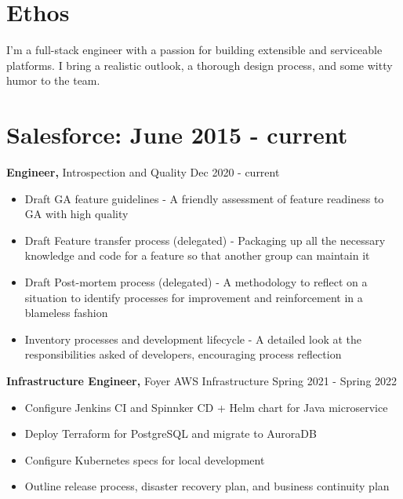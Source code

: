 \documentclass[12pt]{res}
\begin{document}

\address{{\bf Contact Information} \\ (720) 219-7914 \\ gik0geck0@gmail.com \\ Remote in Frederick, CO}
\address{{\bf Open Source} \\ https://github.com/gik0geck0 }

\begin{resume}

\section{Ethos}

I'm a full-stack engineer with a passion for building extensible and serviceable platforms. I bring a realistic outlook, a thorough design process, and some witty humor to the team.

\section{Salesforce: June 2015 - current}

{\bf Engineer,} Introspection and Quality \hfill Dec 2020 - current
\begin{itemize} \itemsep -2pt
    \item Draft GA feature guidelines - A friendly assessment of feature readiness to GA with high quality
    \item Draft Feature transfer process (delegated) - Packaging up all the necessary knowledge and code for a feature so that another group can maintain it
    \item Draft Post-mortem process (delegated) - A methodology to reflect on a situation to identify processes for improvement and reinforcement in a blameless fashion
    \item Inventory processes and development lifecycle - A detailed look at the responsibilities asked of developers, encouraging process reflection
\end{itemize}

{\bf Infrastructure Engineer,} Foyer AWS Infrastructure \hfill Spring 2021 - Spring 2022
\begin{itemize} \itemsep -2pt
    \item Configure Jenkins CI and Spinnker CD + Helm chart for Java microservice
    \item Deploy Terraform for PostgreSQL and migrate to AuroraDB
    \item Configure Kubernetes specs for local development
    \item Outline release process, disaster recovery plan, and business continuity plan
\end{itemize}


\end{resume}
\end{document}
